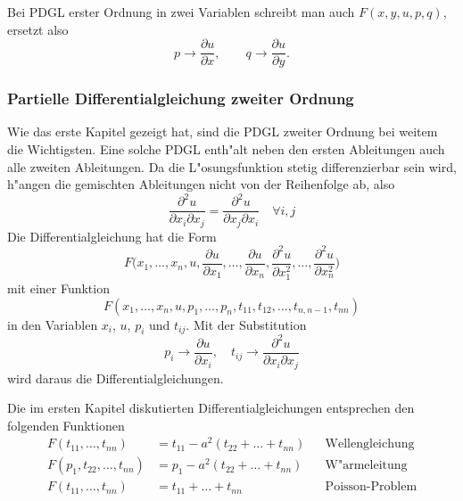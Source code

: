 Bei PDGL erster Ordnung in zwei Variablen schreibt man auch
$F(x,y,u,p,q)$, ersetzt also
\[
p\to\frac{\partial u}{\partial x},
\qquad
q\to\frac{\partial u}{\partial y}.
\]

\subsubsection{Partielle Differentialgleichung zweiter Ordnung}
Wie das erste Kapitel gezeigt hat, sind die PDGL zweiter Ordnung bei weitem
die Wichtigsten. Eine solche PDGL enth"alt neben den ersten Ableitungen
auch alle zweiten Ableitungen. Da die L"osungsfunktion stetig differenzierbar
sein wird, h"angen die gemischten Ableitungen nicht von der Reihenfolge
ab, also
\[
\frac{\partial^2 u}{\partial x_i\partial x_j}
=
\frac{\partial^2 u}{\partial x_j\partial x_i}
\quad\forall i,j
\]
Die Differentialgleichung hat die Form
\[
F\biggl(x_1,\dots,x_n,u,
\frac{\partial u}{\partial x_1},\dots,\frac{\partial u}{\partial x_n},
\frac{\partial^2 u}{\partial x_1^2},\dots,\frac{\partial^2 u}{\partial x_n^2}\biggr)
\]
mit einer Funktion
\[
F(x_1,\dots,x_n,u,p_1,\dots,p_n,t_{11},t_{12},\dots,t_{n,n-1},t_{nn})
\]
in den Variablen $x_i$, $u$, $p_i$ und $t_{ij}$. Mit der Substitution
\[
p_i\to \frac{\partial u}{\partial x_i}
,\quad
t_{ij}\to \frac{\partial^2 u}{\partial x_i\partial x_j}
\]
wird daraus die Differentialgleichungen.

Die im ersten Kapitel diskutierten Differentialgleichungen entsprechen den folgenden 
Funktionen
\begin{align*}
F(t_{11},\dots,t_{nn})&=t_{11}-a^2(t_{22}+\dots+t_{nn})&&\text{Wellengleichung}
\\
F(p_1,t_{22},\dots,t_{nn})&=p_1-a^2(t_{22}+\dots+t_{nn})&&\text{W"armeleitung}
\\
F(t_{11},\dots,t_{nn})&=t_{11}+\dots+t_{nn}&&\text{Poisson-Problem}
\end{align*}

